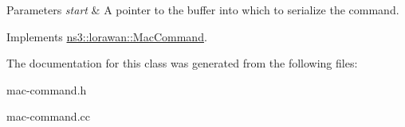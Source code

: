 \begin{DoxyParams}{Parameters}
{\em start} & A pointer to the buffer into which to serialize the command. \\
\hline
\end{DoxyParams}


Implements \hyperlink{classns3_1_1lorawan_1_1MacCommand_a0ed44b33942ddc3dc9694dc06ab0b87f}{ns3\+::lorawan\+::\+Mac\+Command}.



The documentation for this class was generated from the following files\+:\begin{DoxyCompactItemize}
\item 
mac-\/command.\+h\item 
mac-\/command.\+cc\end{DoxyCompactItemize}
